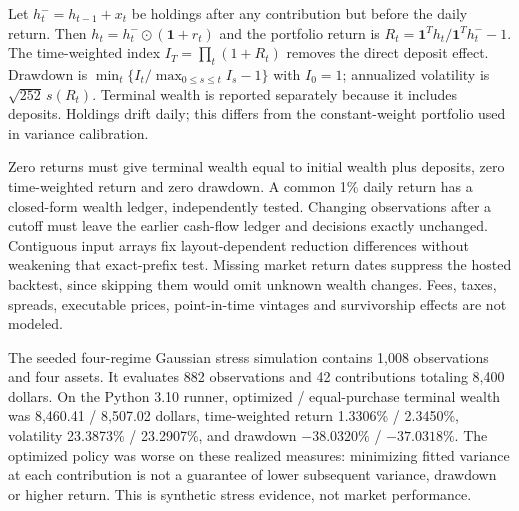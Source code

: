\documentclass[
  american,
  11pt,
]{article}
\begin{document}
Let $h_t^-=h_{t-1}+x_t$ be holdings after any contribution but before the
daily return. Then $h_t=h_t^-\odot(\mathbf1+r_t)$ and the portfolio return is
$R_t=\mathbf1^Th_t/\mathbf1^Th_t^- -1$. The time-weighted index
$I_T=\prod_t(1+R_t)$ removes the direct deposit effect. Drawdown is
$\min_t\{I_t/\max_{0\le s\le t}I_s-1\}$ with $I_0=1$; annualized
volatility is $\sqrt{252}\,s(R_t)$. Terminal wealth is reported separately
because it includes deposits. Holdings drift daily; this differs from the
constant-weight portfolio used in variance calibration.

Zero returns must give terminal wealth equal to initial wealth plus deposits,
zero time-weighted return and zero drawdown. A common 1\% daily return has
a closed-form wealth ledger, independently tested. Changing observations
after a cutoff must leave the earlier cash-flow ledger and decisions exactly
unchanged. Contiguous input arrays fix layout-dependent reduction differences
without weakening that exact-prefix test. Missing market return dates suppress
the hosted backtest, since skipping them would omit unknown wealth changes.
Fees, taxes, spreads, executable prices, point-in-time vintages and survivorship
effects are not modeled.

The seeded four-regime Gaussian stress simulation contains 1,008 observations
and four assets. It evaluates 882 observations and 42 contributions totaling
8,400 dollars. On the Python 3.10 runner, optimized / equal-purchase terminal
wealth was 8,460.41 / 8,507.02 dollars, time-weighted return 1.3306\% / 2.3450\%,
volatility 23.3873\% / 23.2907\%, and drawdown $-38.0320\%$ / $-37.0318\%$.
The optimized policy was worse on these realized measures: minimizing fitted
variance at each contribution is not a guarantee of lower subsequent variance,
drawdown or higher return. This is synthetic stress evidence, not market performance.
\end{document}
